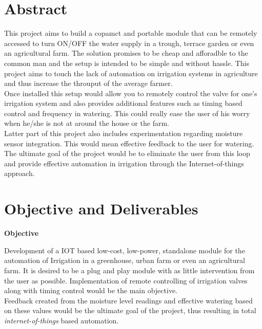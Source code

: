 \documentclass[16pt]{article}
\begin{document}
\section{Abstract}

 \vspace{0.5cm}
 This project aims to build a copamct and portable module that can be remotely accessed 
 to turn ON/OFF the water supply in a trough, terrace garden or even an agricultural farm. The solution promises to be cheap and afforadble to the common man and 
 the setup is intended to be simple and without hassle. This project aims to touch the lack of automation on irrigation systems in agriculture 
 and thus increase the throuput of the average farmer. \\
 
 Once installed this setup would allow you to remotely control the valve for one's irrigation system and also provides additional features such as 
 timing based control and frequency in watering. This could really ease the user of his worry when he/she is not at around the house or the farm. \\
 
 Latter part of this project also includes experimentation regarding moisture sensor integration. This would mean effective feedback to the user for 
 watering. The ultimate goal of the project would be to eliminate the user from this loop and provide effective automation in irrigation through the 
 Internet-of-things approach.


\vspace{12cm}



\section{Objective and Deliverables} 

\vspace{1cm}
  {\Large{\textbf{Objective}}} \\
  
  \vspace{0.1cm}
  
  Development of a IOT based low-cost, low-power, standalone module for the automation of Irrigation in a greenhouse, urban farm or even an agricultural farm.
  It is desired to be a plug and play module with as little intervention from the user as possible. Implementation of remote controlling of irrigation valves 
  along with timing control would be the main objective.\\ Feedback created from the moisture level readings and effective watering based on these values 
  would be the ultimate goal of the project, thus resulting in total \emph{internet-of-things} based automation.
  
\end{document}

